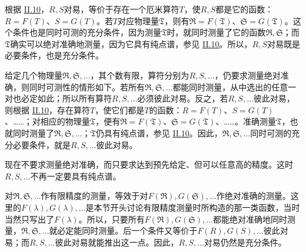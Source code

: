 \documentclass[fontsize=13pt,twoside,openany,headings=normal,parskip=false,bookmarkpackage=false,DIV=calc]{scrbook}
\begin{document}
\hypertarget{origpage-120}{}\label{origpage-120}根据 \hyperref[sec:II.10]{II.10}，$R,\allowbreak S$对易，等价于存在一个厄米算符$T$，使$R,\allowbreak S$都是它的函数：$R=F(T)$、$S=G(T)$。若$T$对应物理量$\mathfrak T$，则有$\mathfrak R=F(\mathfrak T)$、$\mathfrak S=G(\mathfrak T)$。这个条件也是同时可测的充分条件，因为测量$\mathfrak T$时，就同时测量了它的函数$\mathfrak R,\allowbreak \mathfrak S$；而$\mathfrak T$确实可以绝对准确地测量，因为它具有纯点谱，参见 \hyperref[sec:II.10]{II.10}。所以，$R,\allowbreak S$对易既是必要条件，也是充分条件。

给定几个物理量$\mathfrak R,\allowbreak \mathfrak S,\allowbreak \ldots$，其个数有限，算符分别为$R,\allowbreak S,\allowbreak \ldots$，仍要求测量绝对准确，则同时可测性的情形如下。若所有$\mathfrak R,\allowbreak \mathfrak S,\allowbreak \ldots$都能同时测量，从中选出的任意一对也必定如此；所以所有算符$R,\allowbreak S,\allowbreak \ldots$必须彼此对易。反之，若$R,\allowbreak S,\allowbreak \ldots$彼此对易，则根据 \hyperref[sec:II.10]{II.10}，存在算符$T$，使它们都是$T$的函数：$R=F(T)$、$S=G(T)$、……；对相应的物理量$\mathfrak T$，便有$\mathfrak R=F(\mathfrak T)$、$\mathfrak S=G(\mathfrak T)$、……。准确测量$\mathfrak T$，也就同时测量了$\mathfrak R,\allowbreak \mathfrak S,\allowbreak \ldots$；$\mathfrak T$仍具有纯点谱，参见 \hyperref[sec:II.10]{II.10}。因此，$\mathfrak R,\allowbreak \mathfrak S,\allowbreak \ldots$同时可测的充分必要条件，就是$R,\allowbreak S,\allowbreak \ldots$彼此对易。

现在不要求测量绝对准确，而只要求达到预先给定、但可以任意高的精度。这时$R,\allowbreak S,\allowbreak \ldots$不再一定要具有纯点谱。

对$\mathfrak R,\allowbreak \mathfrak S,\allowbreak \ldots$作有限精度的测量，等效于对$F(\mathfrak R),\allowbreak G(\mathfrak S),\allowbreak \ldots$作绝对准确的测量。这里的$F(\lambda),\allowbreak G(\lambda),\allowbreak \ldots$是本节开头讨论有限精度测量时所构造的那一类函数，当时当然只写出了$F(\lambda)$。所以，只要所有$F(\mathfrak R),\allowbreak G(\mathfrak S),\allowbreak \ldots$都能绝对准确地同时测量，$\mathfrak R,\allowbreak \mathfrak S,\allowbreak \ldots$就必定能同时测量。后一个条件又等价于$F(R),\allowbreak G(S),\allowbreak \ldots$彼此对易；而$R,\allowbreak S,\allowbreak \ldots$彼此对易就能推出这一点。因此，$R,\allowbreak S,\allowbreak \ldots$对易仍然是充分条件。
\end{document}
